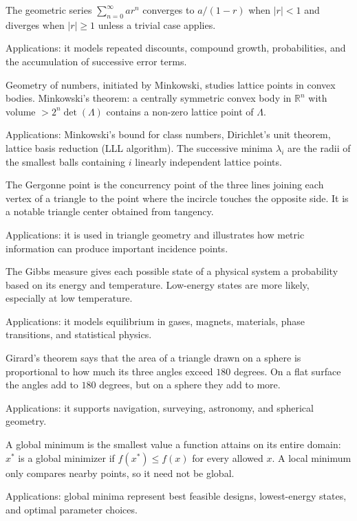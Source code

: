 The geometric series $\sum_{n=0}^{\infty} ar^n$ converges to $a/(1-r)$ when $|r|<1$ and diverges when $|r|\geq 1$ unless a trivial case applies. \par\noindent Applications: it models repeated discounts, compound growth, probabilities, and the accumulation of successive error terms.

Geometry of numbers, initiated by Minkowski, studies lattice points in convex bodies. Minkowski's theorem: a centrally symmetric convex body in $\mathbb{R}^n$ with volume $> 2^n \det(\Lambda)$ contains a non-zero lattice point of $\Lambda$. \par\noindent Applications: Minkowski's bound for class numbers, Dirichlet's unit theorem, lattice basis reduction (LLL algorithm). The successive minima $\lambda_i$ are the radii of the smallest balls containing $i$ linearly independent lattice points.

The Gergonne point is the concurrency point of the three lines joining each vertex of a triangle to the point where the incircle touches the opposite side. It is a notable triangle center obtained from tangency. \par\noindent Applications: it is used in triangle geometry and illustrates how metric information can produce important incidence points.

The Gibbs measure gives each possible state of a physical system a probability based on its energy and temperature. Low-energy states are more likely, especially at low temperature. \par\noindent Applications: it models equilibrium in gases, magnets, materials, phase transitions, and statistical physics.

Girard's theorem says that the area of a triangle drawn on a sphere is proportional to how much its three angles exceed $180$ degrees. On a flat surface the angles add to $180$ degrees, but on a sphere they add to more. \par\noindent Applications: it supports navigation, surveying, astronomy, and spherical geometry.

A global minimum is the smallest value a function attains on its entire domain: $x^*$ is a global minimizer if $f(x^*)\leq f(x)$ for every allowed $x$. A local minimum only compares nearby points, so it need not be global. \par\noindent Applications: global minima represent best feasible designs, lowest-energy states, and optimal parameter choices.

